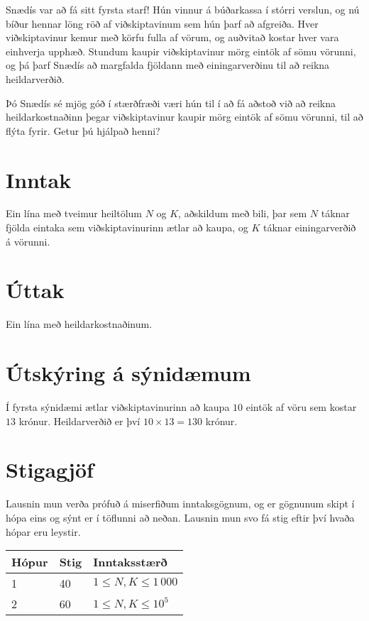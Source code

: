 
Snædís var að fá sitt fyrsta starf! Hún vinnur á búðarkassa í stórri
verslun, og nú bíður hennar löng röð af viðskiptavinum sem hún þarf að
afgreiða. Hver viðskiptavinur kemur með körfu fulla af vörum, og auðvitað
kostar hver vara einhverja upphæð. Stundum kaupir viðskiptavinur mörg eintök af
sömu vörunni, og þá þarf Snædís að margfalda fjöldann með einingarverðinu til
að reikna heildarverðið.

Þó Snædís sé mjög góð í stærðfræði væri hún til í að fá aðstoð við að reikna
heildarkostnaðinn þegar viðskiptavinur kaupir mörg eintök af sömu vörunni, til
að flýta fyrir. Getur þú hjálpað henni?

\section*{Inntak}
Ein lína með tveimur heiltölum $N$ og $K$, aðskildum með bili, þar sem $N$
táknar fjölda eintaka sem viðskiptavinurinn ætlar að kaupa, og $K$ táknar
einingarverðið á vörunni.

\section*{Úttak}
Ein lína með heildarkostnaðinum.

\section*{Útskýring á sýnidæmum}
Í fyrsta sýnidæmi ætlar viðskiptavinurinn að kaupa $10$ eintök af vöru sem
kostar $13$ krónur. Heildarverðið er því $10\times 13 = 130$ krónur.

\section*{Stigagjöf}
Lausnin mun verða prófuð á miserfiðum inntaksgögnum, og er gögnunum skipt í
hópa eins og sýnt er í töflunni að neðan. Lausnin mun svo fá stig eftir því
hvaða hópar eru leystir.

\begin{tabular}{|l|l|l|}
\hline
Hópur & Stig & Inntaksstærð \\ \hline
1     & 40         & $ 1 \le N,K \le 1\,000$ \\ \hline
2     & 60         & $ 1 \le N,K \le 10^5$ \\ \hline
\end{tabular}
